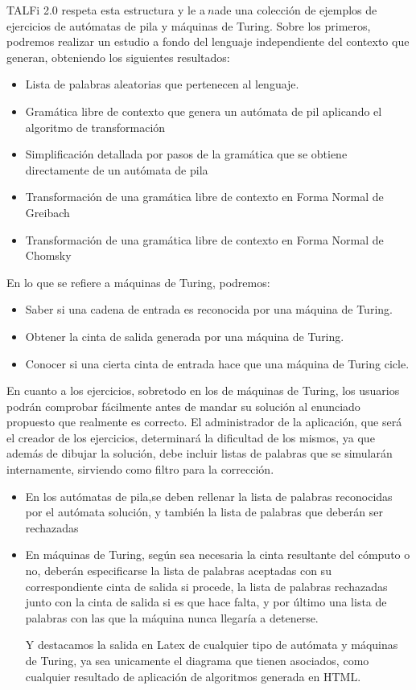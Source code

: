 \documentclass[12pt,a4paper,spanish]{book}
\begin{document}
TALFi 2.0 respeta esta estructura y le a$~n$ade una colecci\'on de ejemplos de ejercicios de aut\'omatas de pila y m\'aquinas de Turing. Sobre los primeros, podremos realizar un estudio a fondo del lenguaje independiente del contexto que generan, obteniendo los siguientes resultados:
\begin{itemize}
\item Lista de palabras aleatorias que pertenecen al lenguaje.
\item Gram\'atica libre de contexto que genera un aut\'omata de pil aplicando el algoritmo de transformaci\'on
\item Simplificaci\'on detallada por pasos de la gram\'atica que se obtiene directamente de un aut\'omata de pila
\item Transformaci\'on de una gram\'atica libre de contexto en Forma Normal de Greibach
\item Transformaci\'on de una gram\'atica libre de contexto en Forma Normal de Chomsky\\
\end{itemize}
\newpage
En lo que se refiere a m\'aquinas de Turing, podremos:
\begin{itemize}
\item Saber si una cadena de entrada es reconocida por una m\'aquina de Turing.
\item Obtener la cinta de salida generada por una m\'aquina de Turing.
\item Conocer si una cierta cinta de entrada hace que una m\'aquina de Turing cicle.
\end{itemize}

En cuanto a los ejercicios, sobretodo en los de m\'aquinas de Turing, los usuarios podr\'an comprobar f\'acilmente antes de mandar su soluci\'on al enunciado propuesto que realmente es correcto.
El administrador de la aplicaci\'on, que ser\'a el creador de los ejercicios, determinar\'a la dificultad de los mismos, ya que adem\'as de dibujar la soluci\'on, debe incluir listas de palabras que se simular\'an internamente, sirviendo como filtro para la correcci\'on.
\begin{itemize}
\item En los aut\'omatas de pila,se deben rellenar la lista de palabras reconocidas por el aut\'omata soluci\'on, y tambi\'en la lista de palabras que deber\'an ser rechazadas
\item En m\'aquinas de Turing, seg\'un sea necesaria la cinta resultante del c\'omputo o no, deber\'an especificarse la lista de palabras aceptadas con su correspondiente cinta de salida si procede, la lista de palabras rechazadas junto con la cinta de salida si es que hace falta, y por \'ultimo una lista de palabras con las que la m\'aquina nunca llegar\'ia a detenerse.

Y destacamos la salida en Latex de cualquier tipo de aut\'omata y m\'aquinas de Turing, ya sea unicamente el diagrama que tienen asociados, como cualquier resultado de aplicaci\'on de algoritmos generada en HTML. 
\end{itemize}
\newpage
\end{document}
